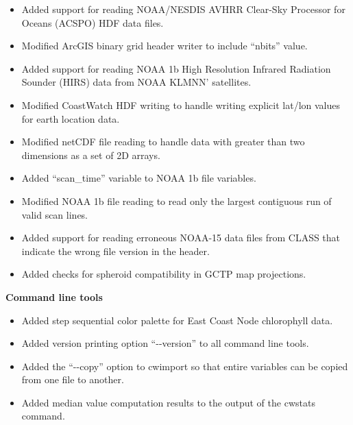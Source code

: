 \begin{itemize}

  \item Added support for reading NOAA/NESDIS AVHRR Clear-Sky
  Processor for Oceans (ACSPO) HDF data files.

  \item Modified ArcGIS binary grid header writer to include ``nbits''
  value.

  \item Added support for reading NOAA 1b High Resolution Infrared
  Radiation Sounder (HIRS) data from NOAA KLMNN' satellites.

  \item Modified CoastWatch HDF writing to handle writing explicit
  lat/lon values for earth location data.

  \item Modified netCDF file reading to handle data with greater than
  two dimensions as a set of 2D arrays.

  \item Added ``scan\_time'' variable to NOAA 1b file variables.

  \item Modified NOAA 1b file reading to read only the largest
  contiguous run of valid scan lines.

  \item Added support for reading erroneous NOAA-15 data files from
  CLASS that indicate the wrong file version in the header.

  \item Added checks for spheroid compatibility in GCTP map
  projections.

\end{itemize}

\hspace{0.4cm} {\bf Command line tools}

\begin{itemize}

  \item Added step sequential color palette for East Coast Node
  chlorophyll data.

  \item Added version printing option ``-{-}version'' to all command
  line tools.

  \item Added the ``-{-}copy'' option to cwimport so that entire
  variables can be copied from one file to another.

  \item Added median value computation results to the output of the
  cwstats command.

\end{itemize}

